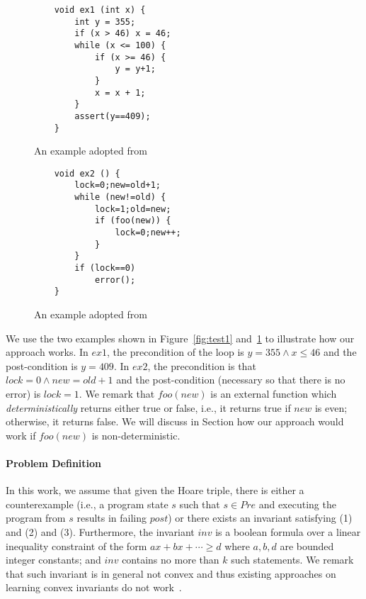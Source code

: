 \begin{figure}[t]
\centering
\begin{minipage}{.5\textwidth}
  \centering
{\scriptsize
\begin{verbatim}
    void ex1 (int x) {
        int y = 355;
        if (x > 46) x = 46;
        while (x <= 100) {
            if (x >= 46) {
                y = y+1;
            }
            x = x + 1;
        }
        assert(y==409);
    }
\end{verbatim}}
  \caption{An example adopted from~\cite{DBLP:conf/popl/GulwaniJ07}}
  \label{fig:test1}
\end{minipage}%
\begin{minipage}{.5\textwidth}
  \centering
    {\scriptsize\begin{verbatim}
    void ex2 () {
        lock=0;new=old+1;
        while (new!=old) {
            lock=1;old=new;
            if (foo(new)) {
                lock=0;new++;
            }
        }
        if (lock==0)
            error();
    }
\end{verbatim}}
  \caption{An example adopted from~\cite{DBLP:conf/popl/HenzingerJMS02}}
  \label{fig:test2}
\end{minipage}
\end{figure}

\begin{example}
We use the two examples shown in Figure~\ref{fig:test1} and~\ref{fig:test2} to illustrate how our approach works. 
In $ex1$, the precondition of the loop is $y = 355 \land x \leq 46$ and the post-condition is $y=409$. 
In $ex2$, the precondition is that $lock=0 \land new=old+1$ and the post-condition (necessary so that there is no error) is $lock=1$. 
We remark that $foo(new)$ is an external function which \emph{deterministically} returns either true or false, 
i.e., it returns true if $new$ is even; otherwise, it returns false. 
We will discuss in Section how our approach would work if $foo(new)$ is non-deterministic.
\end{example}

\paragraph{Problem Definition} In this work, we assume that given the Hoare triple, 
there is either a counterexample (i.e., a program state $s$ such that $s \in Pre$ and executing the program from $s$ results in failing $post$) 
or there exists an invariant satisfying (1) and (2) and (3). 
Furthermore, the invariant $inv$ is a boolean formula over a linear inequality constraint 
of the form $ax + bx + \cdots \geq d$ where $a,b,d$ are bounded integer constants; 
and $inv$ contains no more than $k$ such statements. 
We remark that such invariant is in general not convex and thus existing approaches on learning convex invariants do not work~\cite{}.

